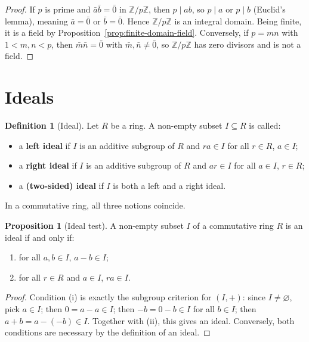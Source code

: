\documentclass[12pt,a4paper,openany]{book}
\theoremstyle{definition}
\newtheorem{definition}{Definition}[chapter]
\newtheorem{proposition}{Proposition}[chapter]
\theoremstyle{remark}
\begin{document}
\begin{proof}
If $p$ is prime and $\bar{a}\bar{b}=\bar{0}$ in $\mathbb{Z}/p\mathbb{Z}$, then $p\mid ab$, so $p\mid a$ or $p\mid b$ (Euclid's lemma), meaning $\bar{a}=\bar{0}$ or $\bar{b}=\bar{0}$. Hence $\mathbb{Z}/p\mathbb{Z}$ is an integral domain. Being finite, it is a field by Proposition~\ref{prop:finite-domain-field}. Conversely, if $p=mn$ with $1<m,n<p$, then $\bar{m}\bar{n}=\bar{0}$ with $\bar{m},\bar{n}\neq\bar{0}$, so $\mathbb{Z}/p\mathbb{Z}$ has zero divisors and is not a field.
\end{proof}

\section{Ideals}\label{sec:ideals}

\begin{definition}[Ideal]\label{def:ideal}
Let $R$ be a ring. A non-empty subset $I\subseteq R$ is called:
\begin{itemize}
    \item a \textbf{left ideal} if $I$ is an additive subgroup of $R$ and $ra\in I$ for all $r\in R$, $a\in I$;
    \item a \textbf{right ideal} if $I$ is an additive subgroup of $R$ and $ar\in I$ for all $a\in I$, $r\in R$;
    \item a \textbf{(two-sided) ideal} if $I$ is both a left and a right ideal.
\end{itemize}
In a commutative ring, all three notions coincide.
\end{definition}

\begin{proposition}[Ideal test]\label{prop:ideal-test}
A non-empty subset $I$ of a commutative ring $R$ is an ideal if and only if:
\begin{enumerate}[label=(\roman*)]
    \item for all $a,b\in I$, $a-b\in I$;
    \item for all $r\in R$ and $a\in I$, $ra\in I$.
\end{enumerate}
\end{proposition}

\begin{proof}
Condition (i) is exactly the subgroup criterion for $(I,+)$: since $I\neq\varnothing$, pick $a\in I$; then $0=a-a\in I$; then $-b=0-b\in I$ for all $b\in I$; then $a+b=a-(-b)\in I$. Together with (ii), this gives an ideal. Conversely, both conditions are necessary by the definition of an ideal.
\end{proof}
\end{document}
